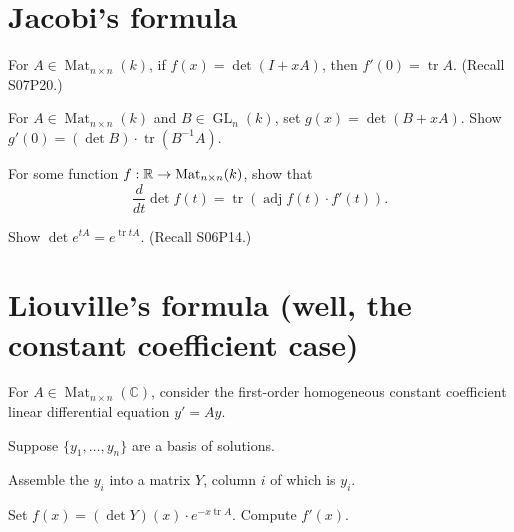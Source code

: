 \documentclass{homework}
\DeclareMathOperator{\Mat}{Mat}
\DeclareMathOperator{\adj}{adj}
\DeclareMathOperator{\GL}{GL}
\DeclareMathOperator{\trace}{tr}
\begin{document}
\vfill

\section{Jacobi's formula}

\begin{problem}
  For $A \in \Mat_{n \times n}(k)$, if $f(x) = \det(I+xA)$, then $f'(0) = \trace A$.  (Recall S07P20.)
\end{problem}

\begin{problem}
  For $A \in \Mat_{n \times n}(k)$ and $B \in \GL_{n}(k)$, set $g(x) = \det(B+xA)$.  Show $g'(0) = (\det B) \cdot \trace (B^{-1} A)$.
\end{problem}

\begin{problem}
  For some function $f : \R \to \Mat_{n \times n}(k)$, show that
  \[
    \frac{d}{dt} \det f(t) = \trace \left( \adj f(t) \cdot f'(t) \right).
  \]
\end{problem}

\begin{problem}
  Show $\det e^{tA} = e^{\trace tA}$.  (Recall S06P14.)
\end{problem}

\vfill

\section{Liouville's formula (well, the constant coefficient case)}

\begin{problem}
  For $A \in \Mat_{n \times n}(\mathbb{C})$, consider the first-order homogeneous constant coefficient linear differential equation $y' = Ay$.

  Suppose $\{ y_1, \ldots, y_n \}$ are a basis of solutions.

  Assemble the $y_i$ into a matrix $Y$, column $i$ of which is $y_i$.

  Set $f(x) = (\det Y)(x) \cdot e^{-x \trace A}$.  Compute $f'(x)$.
\end{problem}
\end{document}
